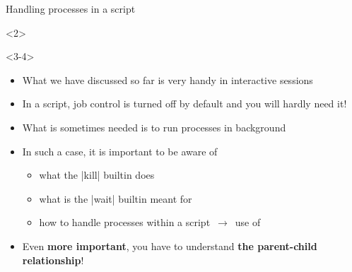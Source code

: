 \begin{frame}{Handling processes in a script}
    \vspace{-6mm}
    \begin{overlayarea}{\textwidth}{0.7\textheight}
        \begin{onlyenv}<2>
            \vspace{-5mm}
            \begin{center}
            \end{center}
        \end{onlyenv}
        \begin{onlyenv}<3-4>
            \begin{itemize}
                \item What we have discussed so far is very handy in interactive sessions
                \item In a script, job control is turned off by default and you will hardly need it!
                \item What is sometimes needed is to run processes in background
                \item In such a case, it is important to be aware of
                      \begin{itemize}
                          \item what the \bash|kill| builtin does
                          \item what is the \bash|wait| builtin meant for
                          \item how to handle processes within a script $\,\to\,$ use of \PB{\texttt{\$!}}
                      \end{itemize}
                \item<4> Even \textbf{more important}, you have to understand \alert{\textbf{the parent-child relationship}}!\\[1ex]

\end{itemize}
\end{onlyenv}
\end{overlayarea}
\end{frame}
